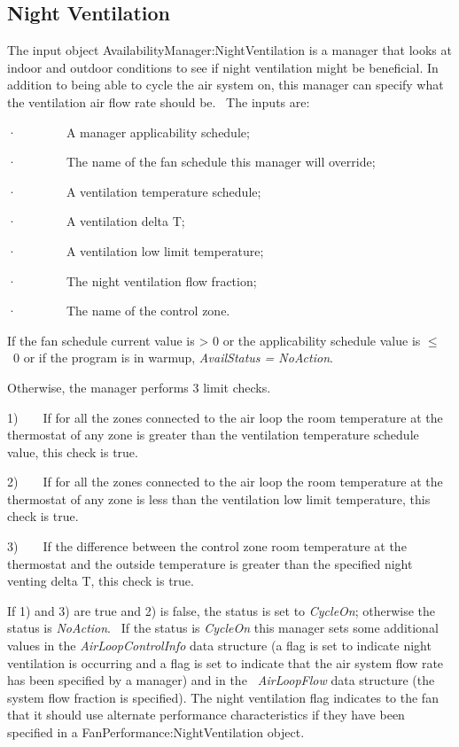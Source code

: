 \subsection{Night Ventilation}\label{night-ventilation}

The input object AvailabilityManager:NightVentilation is a manager that looks at indoor and outdoor conditions to see if night ventilation might be beneficial. In addition to being able to cycle the air system on, this manager can specify what the ventilation air flow rate should be.~ The inputs are:

·~~~~~~~~A manager applicability schedule;

·~~~~~~~~The name of the fan schedule this manager will override;

·~~~~~~~~A ventilation temperature schedule;

·~~~~~~~~A ventilation delta T;

·~~~~~~~~A ventilation low limit temperature;

·~~~~~~~~The night ventilation flow fraction;

·~~~~~~~~The name of the control zone.

If the fan schedule current value is \textgreater{} 0 or the applicability schedule value is \(\le\) ~0 or if the program is in warmup, \emph{AvailStatus = NoAction}.

Otherwise, the manager performs 3 limit checks.

1)~~~~If for all the zones connected to the air loop the room temperature at the thermostat of any zone is greater than the ventilation temperature schedule value, this check is true.

2)~~~~If for all the zones connected to the air loop the room temperature at the thermostat of any zone is less than the ventilation low limit temperature, this check is true.

3)~~~~If the difference between the control zone room temperature at the thermostat and the outside temperature is greater than the specified night venting delta T, this check is true.

If 1) and 3) are true and 2) is false, the status is set to \emph{CycleOn}; otherwise the status is \emph{NoAction}.~ If the status is \emph{CycleOn} this manager sets some additional values in the \emph{AirLoopControlInfo} data structure (a flag is set to indicate night ventilation is occurring and a flag is set to indicate that the air system flow rate has been specified by a manager) and in the \emph{~AirLoopFlow} data structure (the system flow fraction is specified). The night ventilation flag indicates to the fan that it should use alternate performance characteristics if they have been specified in a FanPerformance:NightVentilation object.

